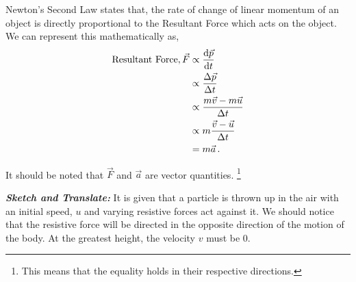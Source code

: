 %
%
%


\begin{subquestions}
	
\subquestion

\begin{subsubquestions}
	
\subsubquestion

Newton's Second Law states that, the rate of change of linear momentum of an object is directly proportional to the Resultant Force which acts on the object. We can represent this mathematically as,
\begin{align} 
	\text{Resultant Force}, \vec{F} & \propto \frac{\mathrm{d}\vec{p}}{\mathrm{d}t} \nonumber \\
	             & \propto \frac{\Delta \vec{p}}{\Delta t} \nonumber \\
	             & \propto \frac{m\vec{v}-m\vec{u}}{\Delta t} \nonumber \\
	             & \propto m\frac{\vec{v}-\vec{u}}{\Delta t} \nonumber \\
	             & = m\vec{a} \,.
\end{align}

It should be noted that $\vec{F}$ and $\vec{a}$ are vector quantities. \footnote{This means that the equality holds in their respective directions.}
\end{subsubquestions}
	

\subsubquestion
	
\textbf{\textit{Sketch and Translate:}}
It is given that a particle is thrown up in the air with an initial speed, $u$ and varying resistive forces act against it. We should notice that the resistive force will be directed in the opposite direction of the motion of the body. At the greatest height, the velocity $v$ must be 0.\\





\end{subquestions}
